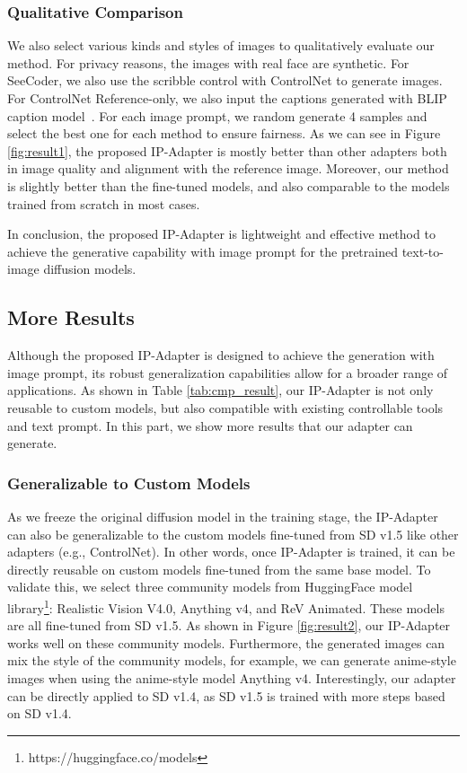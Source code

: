 \documentclass{article}
\begin{document}
\subsubsection{Qualitative Comparison}
We also select various kinds and styles of images to qualitatively evaluate our method. For privacy reasons, the images with real face are synthetic. For SeeCoder, we also use the scribble control with ControlNet to generate images. For ControlNet Reference-only, we also input the captions generated with BLIP caption model~\cite{li2022blip}. For each image prompt, we random generate 4 samples and select the best one for each method to ensure fairness. As we can see in Figure \ref{fig:result1}, the proposed IP-Adapter is mostly better than other adapters both in image quality and alignment with the reference image. Moreover, our method is slightly better than the fine-tuned models, and also comparable to the models trained from scratch in most cases.

In conclusion, the proposed IP-Adapter is lightweight and effective method to achieve the generative capability with image prompt for the pretrained text-to-image diffusion models.

\subsection{More Results}
Although the proposed IP-Adapter is designed to achieve the generation with image prompt, its robust generalization capabilities allow for a broader range of applications. As shown in Table \ref{tab:cmp_result}, our IP-Adapter is not only reusable to custom models, but also compatible with existing controllable tools and text prompt. In this part, we show more results that our adapter can generate.
\subsubsection{Generalizable to Custom Models}
As we freeze the original diffusion model in the training stage, the IP-Adapter can also be generalizable to the custom models fine-tuned from SD v1.5 like other adapters (e.g., ControlNet). In other words, once IP-Adapter is trained, it can be directly reusable on custom models fine-tuned from the same base model. To validate this, we select three community models from HuggingFace model library\footnote{https://huggingface.co/models}: Realistic Vision V4.0, Anything v4, and ReV Animated. These models are all fine-tuned from SD v1.5. As shown in Figure \ref{fig:result2}, our IP-Adapter works well on these community models. Furthermore, the generated images can mix the style of the community models, for example, we can generate anime-style images when using the anime-style model Anything v4. Interestingly, our adapter can be directly applied to SD v1.4, as SD v1.5 is trained with more steps based on SD v1.4.
\end{document}
